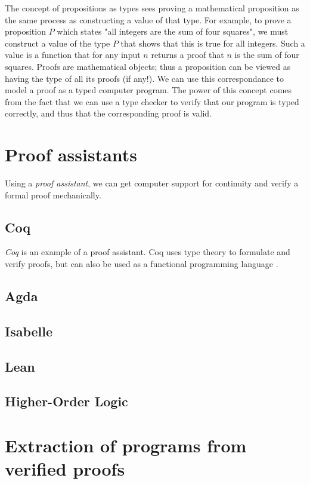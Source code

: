 
The concept of propositions as types sees proving a mathematical proposition
as the same process as constructing a value of that type.
For example, to prove a proposition $P$ which states "all integers are the sum of four squares",
we must construct a value of the type $P$ that shows that this is true for all integers.
Such a value is a function that for any input $n$ returns a proof that $n$ is the sum of four squares.
Proofs are mathematical objects; thus a proposition can be viewed as having the type of all its proofs (if any!).
We can use this correspondance to model a proof as a typed computer program.
The power of this concept comes from the fact that we can use a type checker to verify that
our program is typed correctly, and thus that the corresponding proof is valid.


\section{Proof assistants}

Using a \textit{proof assistant}, we can get computer support for continuity and verify a formal proof mechanically.

\subsection{Coq}
\textit{Coq} is an example of a proof assistant.
Coq uses type theory to formulate and verify proofs, but can also be used as a functional programming language \cite{cintro}.

\subsection{Agda}

\subsection{Isabelle}

\subsection{Lean}

\subsection{Higher-Order Logic}

\section{Extraction of programs from verified proofs}
